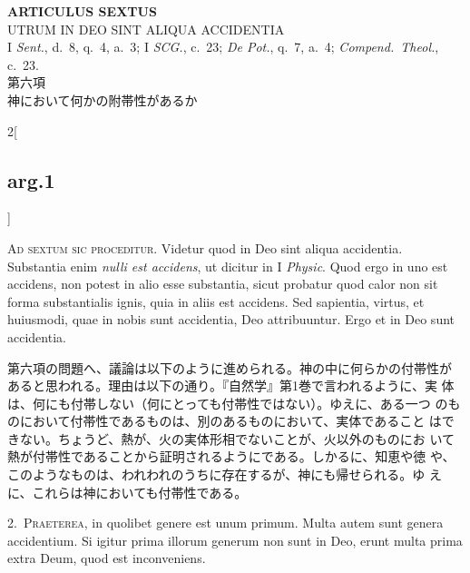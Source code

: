 \documentclass[paper=a4paper,fontsize=10pt,jafontsize=9pt,titlepage]{jlreq}
\begin{document}
\newpage
{}
{}
\setcounter{section}{6}
\setcounter{subsection}{0}


\begin{center}
 {\Large {\bfseries ARTICULUS SEXTUS}}\\
 {\large UTRUM IN DEO SINT ALIQUA ACCIDENTIA}\\
 {\footnotesize I {\itshape Sent.}, d.~8, q.~4, a.~3; I {\itshape SCG.},
 c.~23; {\itshape De Pot.}, q.~7, a.~4; {\itshape Compend.~Theol.},
 c.~23.}\\
 {\Large 第六項\\神において何かの附帯性があるか}
\end{center}

\begin{paracol}{2}[\subsection{arg.1}]

{\huge A}{\scshape d sextum sic proceditur}. Videtur quod in Deo sint
 aliqua accidentia. Substantia enim {\itshape nulli est accidens}, ut
 dicitur in I {\itshape Physic}. Quod ergo in uno est accidens, non
 potest in alio esse substantia, sicut probatur quod calor non sit
 forma substantialis ignis, quia in aliis est accidens. Sed sapientia,
 virtus, et huiusmodi, quae in nobis sunt accidentia, Deo
 attribuuntur. Ergo et in Deo sunt accidentia.

\switchcolumn

第六項の問題へ、議論は以下のように進められる。神の中に何らかの付帯性が
あると思われる。理由は以下の通り。『自然学』第1巻で言われるように、実
体は、何にも付帯しない（何にとっても付帯性ではない）。ゆえに、ある一つ
のものにおいて付帯性であるものは、別のあるものにおいて、実体であること
はできない。ちょうど、熱が、火の実体形相でないことが、火以外のものにお
いて熱が付帯性であることから証明されるようにである。しかるに、知恵や徳
や、このようなものは、われわれのうちに存在するが、神にも帰せられる。ゆ
えに、これらは神においても付帯性である。


2.~{\scshape Praeterea}, in quolibet genere est unum primum. Multa autem sunt
 genera accidentium. Si igitur prima illorum generum non sunt in Deo,
 erunt multa prima extra Deum, quod est inconveniens.


\end{paracol}
\end{document}
